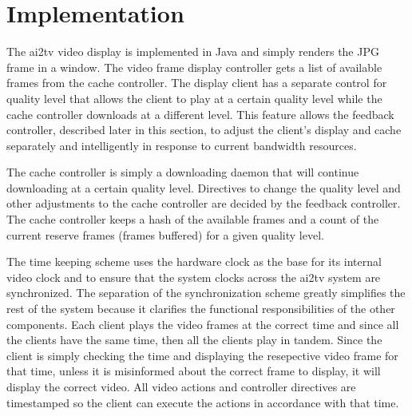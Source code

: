 \documentclass{sig-alternate}
\begin{document}
% 

\section{Implementation} \label{implementation}

The ai2tv video display is implemented in Java and simply renders the
JPG frame in a window.  The video frame display controller gets a list
of available frames from the cache controller.  The display client has
a separate control for quality level that allows the client to play at
a certain quality level while the cache controller downloads at a
different level.  This feature allows the feedback controller,
described later in this section, to adjust the client's display and
cache separately and intelligently in response to current bandwidth
resources.

The cache controller is simply a downloading daemon that will continue
downloading at a certain quality level.  Directives to change the
quality level and other adjustments to the cache controller are
decided by the feedback controller.  The cache controller keeps a hash
of the available frames and a count of the current reserve frames
(frames buffered) for a given quality level.

The time keeping scheme uses the hardware clock as the base for its
internal video clock and to ensure that the system clocks across the
ai2tv system are synchronized.  The separation of the synchronization
scheme greatly simplifies the rest of the system because it clarifies
the functional responsibilities of the other components.  Each client
plays the video frames at the correct time and since all the clients
have the same time, then all the clients play in tandem.  Since the
client is simply checking the time and displaying the resepective
video frame for that time, unless it is misinformed about the correct
frame to display, it will display the correct video.  All video
actions and controller directives are timestamped so the client can
execute the actions in accordance with that time.
\end{document}
